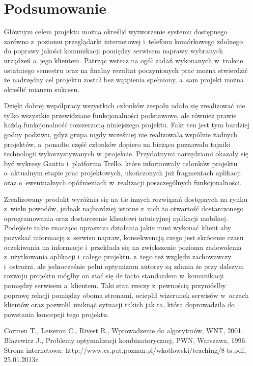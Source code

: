 \documentclass[a4paper,11pt]{article}
\begin{document}
\section{Podsumowanie}
Głównym celem projektu można określić wytworzenie systemu dostępnego zarówno z~poziomu przeglądarki internetowej i~telefonu komórkowego zdolnego do poprawy jakości komunikacji pomiędzy serwisem naprawy wybranych urządzeń a~jego klientem. Patrząc wstecz na ogół zadań wykonanych w~trakcie ostatniego semestru oraz na finalny rezultat poczynionych prac można stwierdzić że nadrzędny cel projektu został bez wątpienia spełniony, a~sam projekt można określić mianem sukcesu.

Dzięki dobrej współpracy wszystkich członków zespołu udało się zrealizować nie tylko wszystkie przewidziane funkcjonalności podstawowe, ale również prawie każdą funkcjonalność rozszerzoną niniejszego projektu. Fakt ten jest tym bardziej godny podziwu, gdyż grupa nigdy wcześniej nie realizowała wspólnie żadnych projektów, a~ponadto część członków dopiero na bieżąco poznawało tajniki technologii wykorzystywanych w~projekcie. Przydatnymi narzędziami okazały się być wykresy Gantta i~platforma Trello, które informowały członków projektu o~aktualnym etapie prac projektowych, ukończonych już fragmentach aplikacji oraz o~ewentualnych opóźnieniach w~realizacji poszczególnych funkcjonalności.

Zrealizowany produkt wyróżnia się na tle innych rozwiązań dostępnych na rynku z~wielu powodów, jednak najbardziej istotne z~nich to otwartość dostarczonego oprogramowania oraz dostarczenie klientowi intuicyjnej aplikacji mobilnej. Podejście takie znacząco upraszcza działania jakie musi wykonać klient aby pozyskać informację z~serwisu napraw, konsekwencją czego jest skrócenie czasu oczekiwania na informacje i~przekłada się na zwiększenie poziomu zadowolenia z~użytkowania aplikacji i~całego projektu. z~tego też względu zachowawczy i~ostrożni, ale jednocześnie pełni optymizmu autorzy są zdania że przy dalszym rozwoju projektu mógłby on stać się de facto standardem w~komunikacji pomiędzy serwisem a~klientem. Taki stan rzeczy z~pewnością przyniósłby poprawę relacji pomiędzy oboma stronami, ocieplił wizerunek serwisów w~oczach klientów oraz pozwolił uniknąć sytuacji takich jak ta, która doprowadziła do powstania koncepcji tego projektu.

\newpage
\listoffigures
{} 
\newpage
\listoftables
{}



\newpage
{}
\begin{thebibliography}{9}
 Cormen T., Leiseron C., Rivest R., Wprowadzenie do algorytmów, WNT, 2001. 
 Błażewicz J., Problemy optymalizacji kombinatorycznej, PWN, Warszawa, 1996.
 Strona internetowa: http://www.cs.put.poznan.pl/wkotlowski/teaching/8-ts.pdf, 25.01.2013r.
\end{thebibliography}
\end{document}
